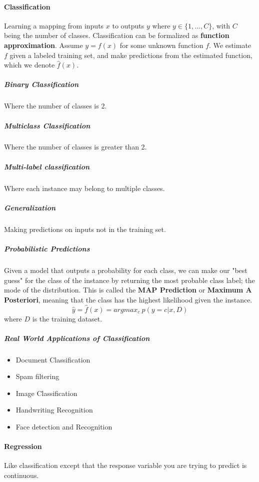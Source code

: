 \documentclass[11pt]{article}
\theoremstyle{definition}
\begin{document}
        \paragraph{Classification}
            Learning a mapping from inputs $x$ to outputs $y$ where $y\in \{1,..., C\}$, with $C$ being the number of classes.
            Classification can be formalized as \textbf{function approximation}.
            Assume $y=f(x)$ for some unknown function $f$. We estimate $f$ given a labeled training set, and make predictions from the estimated function, which we denote $\hat{f}(x)$.
            \subparagraph{Binary Classification}    
                Where the number of classes is 2.
            \subparagraph{Multiclass Classification}
                Where the number of classes is greater than 2.
            \subparagraph{Multi-label classification}
                Where each instance may belong to multiple classes.
            \subparagraph{Generalization}
                Making predictions on inputs not in the training set.
            \subparagraph{Probabilistic Predictions}
                Given a model that outputs a probability for each class, we can make our "best guess" for the class of the instance by returning the most probable class label; the mode of the distribution. This is called the \textbf{MAP Prediction} or \textbf{Maximum A Posteriori}, meaning that the class has the highest likelihood given the instance.
                \begin{equation}
                    \hat{y}=\hat{f}(x)=argmax_c\ p(y=c|x,D)
                \end{equation}
                where $D$ is the training dataset.
            \subparagraph{Real World Applications of Classification}
                \begin{itemize}
                    \item Document Classification
                    \item Spam filtering
                    \item Image Classification
                    \item Handwriting Recognition
                    \item Face detection and Recognition
                \end{itemize}
        \paragraph{Regression}
            Like classification except that the response variable you are trying to predict is continuous.
\end{document}
